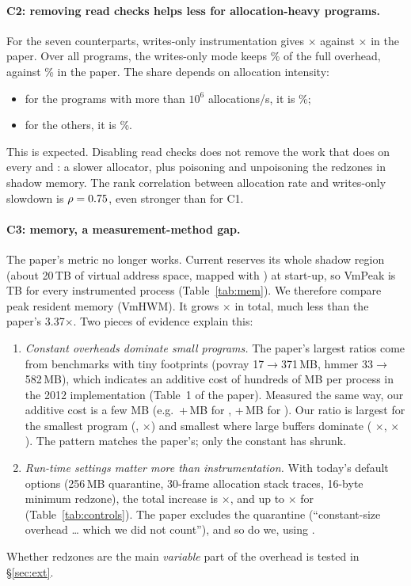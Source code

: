 \paragraph{C2: removing read checks helps less for allocation-heavy programs.}
For the seven counterparts, writes-only instrumentation gives \OurMapWO$\times$
against \PaperMapWO$\times$ in the paper. Over all programs, the writes-only
mode keeps \WOShare\% of the full overhead, against \PaperWOShare\% in the
paper. The share depends on allocation intensity:
\begin{itemize}
\item for the \NumHiAlloc{} programs with more than $10^6$ allocations/s, it
is \WOShareHi\%;
\item for the others, it is \WOShareLo\%.
\end{itemize}
This is expected. Disabling read checks does not remove the work that \asan{}
does on every  and : a slower allocator, plus poisoning
and unpoisoning the redzones in shadow memory. The rank correlation between
allocation rate and writes-only slowdown is $\rho=0.75$, even
stronger than for C1.

\paragraph{C3: memory, a measurement-method gap.}
The paper's metric no longer works. Current \asan{} reserves its whole shadow
region (about 20\,TB of virtual address space, mapped with
) at start-up, so VmPeak is \VmPeakAsanTB\,TB for every
instrumented process (Table~\ref{tab:mem}). We therefore compare peak resident
memory (VmHWM). It grows \OurMemTotal$\times$ in total, much less than the
paper's 3.37$\times$. Two pieces of evidence explain this:
\begin{enumerate}
\item \emph{Constant overheads dominate small programs.} The paper's largest
ratios come from benchmarks with tiny footprints (povray 17$\rightarrow$371\,MB,
hmmer 33$\rightarrow$582\,MB), which indicates an additive cost of hundreds of
MB per process in the 2012 implementation (Table~1 of the paper). Measured
the same way, our additive cost is a few MB (e.g.\ +\MemAddHmmer\,MB for
, +\MemAddBzip\,MB for ). Our ratio is largest for the
smallest program (, \MemHmmer$\times$) and smallest where large
buffers dominate ( \MemStockfish$\times$, 
\MemX$\times$). The pattern matches the paper's; only the constant has
shrunk.
\item \emph{Run-time settings matter more than instrumentation.} With
today's default options (256\,MB quarantine, 30-frame allocation stack traces,
16-byte minimum redzone), the total increase is \CtrlMemDefault$\times$, and
up to \CtrlMemDefMax$\times$ for \cmd{\CtrlMemDefMaxName}
(Table~\ref{tab:controls}). The paper excludes the quarantine (``constant-size
overhead \dots{} which we did not count''), and so do we, using
.
\end{enumerate}
Whether redzones are the main \emph{variable} part of the overhead is tested
in \S\ref{sec:ext}.

